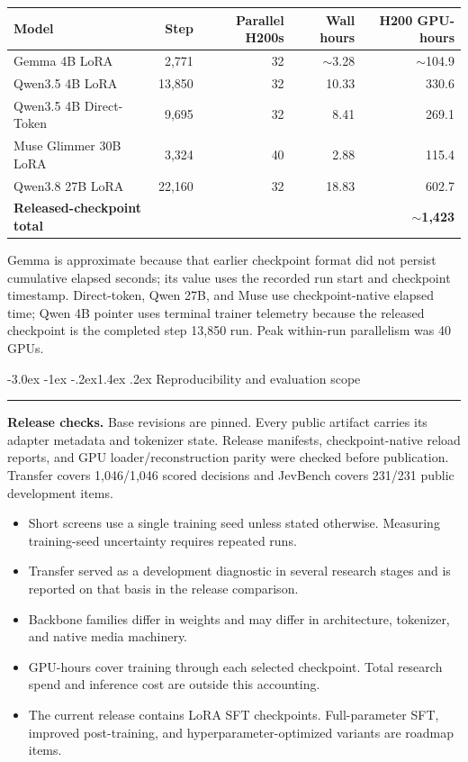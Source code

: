 \documentclass[10pt]{article}
\makeatletter
\renewcommand\section{\@startsection{section}{1}{\z@}%
  {-3.0ex \@plus -1ex \@minus -.2ex}{1.4ex \@plus .2ex}%
  {\color{navy}\Large\bfseries}}
\newenvironment{summarybox}{%
  \par\medskip\noindent\begin{center}\begin{minipage}{.94\linewidth}%
  \color{ink}\textcolor{blue}{\rule{3pt}{\baselineskip}}\hspace{7pt}%
}{\end{minipage}\end{center}\medskip}
\makeatother
\begin{document}
\begin{tabular}{p{.34\linewidth}rrrr}
\toprule
Model & Step & Parallel H200s & Wall hours & H200 GPU-hours \\
\midrule
Gemma 4B LoRA & 2,771 & 32 & $\sim$3.28 & $\sim$104.9 \\
Qwen3.5 4B LoRA & 13,850 & 32 & 10.33 & 330.6 \\
Qwen3.5 4B Direct-Token & 9,695 & 32 & 8.41 & 269.1 \\
Muse Glimmer 30B LoRA & 3,324 & 40 & 2.88 & 115.4 \\
Qwen3.8 27B LoRA & 22,160 & 32 & 18.83 & 602.7 \\
\midrule
\textbf{Released-checkpoint total} & & & & \textbf{$\sim$1,423} \\
\bottomrule
\end{tabular}

Gemma is approximate because that earlier checkpoint format did not persist
cumulative elapsed seconds; its value uses the recorded run start and checkpoint
timestamp. Direct-token, Qwen 27B, and Muse use checkpoint-native elapsed time;
Qwen 4B pointer uses terminal trainer telemetry because the released checkpoint
is the completed step 13,850 run. Peak within-run parallelism was 40 GPUs.

\clearpage
\section{Reproducibility and evaluation scope}

\begin{summarybox}
\textbf{Release checks.} Base revisions are pinned. Every public artifact carries
its adapter metadata and tokenizer state. Release manifests, checkpoint-native
reload reports, and GPU loader/reconstruction parity were checked before
publication. Transfer covers 1,046/1,046 scored decisions and JevBench covers
231/231 public development items.
\end{summarybox}

\begin{itemize}
  \item Short screens use a single training seed unless stated otherwise.
  Measuring training-seed uncertainty requires repeated runs.
  \item Transfer served as a development diagnostic in several research stages
  and is reported on that basis in the release comparison.
  \item Backbone families differ in weights and may differ in architecture,
  tokenizer, and native media machinery.
  \item GPU-hours cover training through each selected checkpoint. Total research
  spend and inference cost are outside this accounting.
  \item The current release contains LoRA SFT checkpoints. Full-parameter SFT,
  improved post-training, and hyperparameter-optimized variants are roadmap
  items.
\end{itemize}
\end{document}

